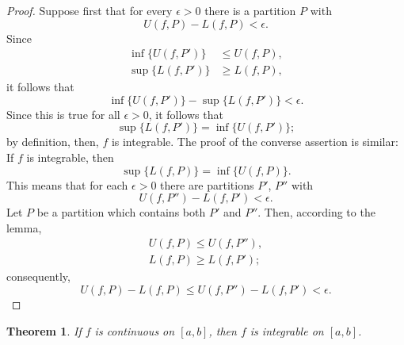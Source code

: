 \documentclass{article}
\newtheorem{theorem}{Theorem}
\begin{document}
\begin{proof}
  Suppose first that for every $\epsilon > 0$ there is a partition $P$ with
  \begin{equation*}
    U(f, P) - L(f, P) < \epsilon.
  \end{equation*} Since \begin{align*}
    \inf\{U(f, P')\} &\leq U(f, P), \\
    \sup\{L(f, P')\} &\geq L(f, P),
  \end{align*} it follows that \begin{equation*}
    \inf\{U(f, P')\} - \sup\{L(f, P')\} < \epsilon.
  \end{equation*} Since this is true for all $\epsilon > 0$, it follows that
  \begin{equation*}
    \sup\{L(f, P')\} = \inf\{U(f, P')\};
  \end{equation*} by definition, then, $f$ is integrable. The proof of the
  converse assertion is similar: If $f$ is integrable, then \begin{equation*}
    \sup\{L(f, P)\} = \inf\{U(f, P)\}.
  \end{equation*} This means that for each $\epsilon > 0$ there are partitions
  $P'$, $P''$ with \begin{equation*}
    U(f, P'') - L(f, P') < \epsilon.
  \end{equation*} Let $P$ be a partition which contains both $P'$ and $P''$.
  Then, according to the lemma, \begin{align*}
    U(f, P) \leq U(f, P''), \\
    L(f, P) \geq L(f, P');
  \end{align*} consequently, \begin{equation*}
    U(f, P) - L(f, P) \leq U(f, P'') - L(f, P') < \epsilon.
  \end{equation*}
\end{proof}

\begin{theorem}
  If $f$ is continuous on $[a, b]$, then $f$ is integrable on $[a, b]$.
\end{theorem}
\end{document}
